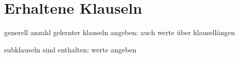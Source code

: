 \section{Erhaltene Klauseln}
\label{sec:ana:acquired}

generell anzahl gelernter klauseln angeben: auch werte über klausellängen

subklauseln sind enthalten: werte angeben

